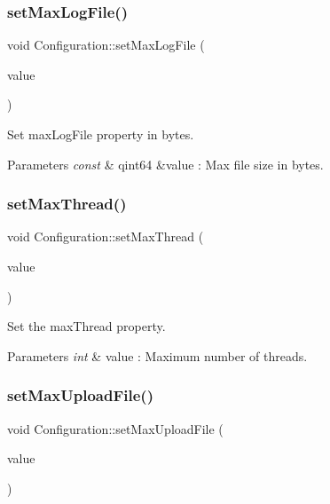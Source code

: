 \subsubsection{\texorpdfstring{set\+Max\+Log\+File()}{setMaxLogFile()}}
{\footnotesize\ttfamily void Configuration\+::set\+Max\+Log\+File (\begin{DoxyParamCaption}\item[{const qint64 \&}]{value }\end{DoxyParamCaption})}



Set max\+Log\+File property in bytes. 


\begin{DoxyParams}{Parameters}
{\em const} & qint64 \&value \+: Max file size in bytes. \\
\hline
\end{DoxyParams}
\mbox{\label{class_configuration_ab242af54d85d49b88b778a50a77949a5}} 
\subsubsection{\texorpdfstring{set\+Max\+Thread()}{setMaxThread()}}
{\footnotesize\ttfamily void Configuration\+::set\+Max\+Thread (\begin{DoxyParamCaption}\item[{int}]{value }\end{DoxyParamCaption})}



Set the max\+Thread property. 


\begin{DoxyParams}{Parameters}
{\em int} & value \+: Maximum number of threads. \\
\hline
\end{DoxyParams}
\mbox{\label{class_configuration_ada37d2f25a05d7b9fa5676f824b7e3be}} 
\subsubsection{\texorpdfstring{set\+Max\+Upload\+File()}{setMaxUploadFile()}}
{\footnotesize\ttfamily void Configuration\+::set\+Max\+Upload\+File (\begin{DoxyParamCaption}\item[{const qint64 \&}]{value }\end{DoxyParamCaption})}



